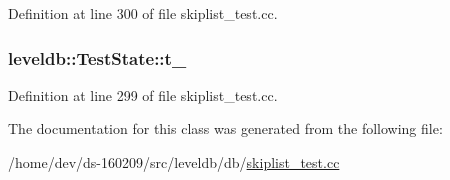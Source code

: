 Definition at line 300 of file skiplist\+\_\+test.\+cc.

\hypertarget{classleveldb_1_1_test_state_a090fd0c59fb141c4843511b4020f05e9}{}
\subsubsection[{t\+\_\+}]{ leveldb\+::\+Test\+State\+::t\+\_\+}\label{classleveldb_1_1_test_state_a090fd0c59fb141c4843511b4020f05e9}


Definition at line 299 of file skiplist\+\_\+test.\+cc.



The documentation for this class was generated from the following file\+:\begin{DoxyCompactItemize}
\item 
/home/dev/ds-\/160209/src/leveldb/db/\hyperlink{skiplist__test_8cc}{skiplist\+\_\+test.\+cc}\end{DoxyCompactItemize}
